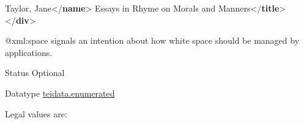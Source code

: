 \begin{reflist}
\begin{sansreflist}
\begin{reflist}
\hspace*{1em}\mbox{}\newline 
\hspace*{1em}\mbox{}\newline 
\hspace*{1em}\hspace*{1em}\mbox{}\newline 
\hspace*{1em}\hspace*{1em}\hspace*{1em}Taylor, Jane{</\textbf{name}>}\mbox{}\newline 
\hspace*{1em}\hspace*{1em}\mbox{}\newline 
\hspace*{1em}\hspace*{1em}\mbox{}\newline 
\hspace*{1em}\hspace*{1em}\hspace*{1em}Essays in Rhyme on Morals and Manners{</\textbf{title}>}\mbox{}\newline 
\hspace*{1em}\hspace*{1em}\mbox{}\newline 
\hspace*{1em}\mbox{}\newline 
{}\mbox{}\newline 
{</\textbf{div}>}
\end{reflist}  
    \item[@xml:space]
  signals an intention about how white space should be managed by applications.
\begin{reflist}
    \item[{Status}]
  Optional
    \item[{Datatype}]
  \hyperref[TEI.teidata.enumerated]{teidata.enumerated}
    \item[{Legal values are:}]
  \begin{description}


\end{description}
\end{reflist}
\end{sansreflist}
\end{reflist}
